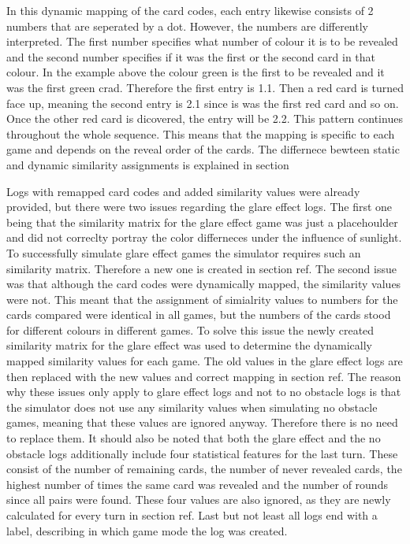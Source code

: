  In this dynamic mapping of the card codes, each entry likewise consists of 2 numbers that are seperated by a dot. However, the numbers are differently interpreted. The first number specifies what number of colour it is to be revealed and the second number specifies if it was the first or the second card in that colour. In the example above the colour green is the first to be revealed and it was the first green crad. Therefore the first entry is 1.1. Then a red card is turned face up, meaning the second entry is 2.1 since is was the first red card and so on. Once the other red card is dicovered, the entry will be 2.2. This pattern continues throughout the whole sequence. This means that the mapping is specific to each game and depends on the reveal order of the cards. The differnece bewteen static and dynamic similarity assignments is explained in section 

Logs with remapped card codes and added similarity values were already provided, but there were two issues regarding the glare effect logs. The first one being that the similarity matrix for the glare effect game was just a placehoulder and did not correclty portray the color differneces under the influence of sunlight. To successfully simulate glare effect games the simulator requires such an similarity matrix. Therefore a new one is created in section ref. The second issue was that although the card codes were dynamically mapped, the similarity values were not. This meant that the assignment of simialrity values to numbers for the cards compared were identical in all games, but the numbers of the cards stood for different colours in different games. To solve this issue the newly created similarity matrix for the glare effect was used to determine the dynamically mapped similarity values for each game. The old values in the glare effect logs are then replaced with the new values and correct mapping in section ref. The reason why these issues only apply to glare effect logs and not to no obstacle logs is that the simulator does not use any similarity values when simulating no obstacle games, meaning that these values are ignored anyway. Therefore there is no need to replace them. It should also be noted that both the glare effect and the no obstacle logs additionally include four statistical features for the last turn. These consist of the number of remaining cards, the number of never revealed cards, the highest number of times the same card was revealed and the number of rounds since all pairs were found. These four values are also ignored, as they are newly calculated for every turn in section ref. Last but not least all logs end with a label, describing in which game mode the log was created. 

